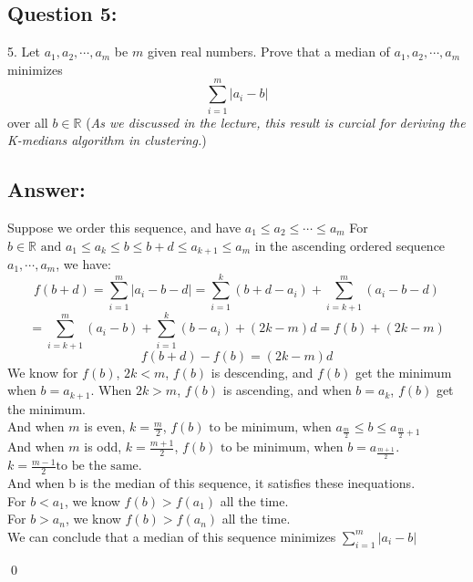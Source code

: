 \documentclass{article}
\newcommand{\R}{\mathbb{R}}
\renewenvironment{proof}{\begin{addmargin}[1em]{0em}\begin{newproof}}
{\end{newproof}\end{addmargin}\qed}
\begin{document}
\subsection*{Question 5:}
5. Let \(a_1, a_2, \cdots, a_m\) be \(m\) given real numbers. Prove that a median of \(a_1, a_2, \cdots, a_m\) minimizes
\[
    \sum_{i=1}^m|a_i - b|
\]
over all \(b \in \R\) (\textit{As we discussed in the lecture, this result is curcial for deriving the K-medians algorithm in clustering.})
\subsection*{Answer:}
\begin{proof}
Suppose we order this sequence, and have \(a_1 \leq a_2 \leq \cdots \leq a_m\) For \(b \in \R \text{ and } a_1 \leq a_k \leq b \leq b + d \leq a_{k+1}\leq a_m\) in the ascending ordered sequence \(a_1, \cdots, a_m\), we have:
\[
    f(b + d) = \sum_{i=1}^m|a_i - b - d| = \sum_{i=1}^{k}(b + d -a_i) + \sum_{i=k+1}^m(a_i - b - d)
\]
\[
    = \sum_{i=k+1}^m (a_i - b) + \sum_{i=1}^{k}(b - a_i) + (2k - m)d = f(b) + (2k-m)
\]
\[
    f(b + d) - f(b) = (2k - m)d
\]
We know for \(f(b)\), \(2k < m\), \(f(b)\) is descending, and \(f(b)\) get the minimum when \(b = a_{k+1}\). 
When \(2k > m\), \(f(b)\) is ascending, and when \(b = a_k\), \(f(b)\) get the minimum. \\

And when \(m\) is even, \(k = \frac m 2\), \(f(b)  \text{ to be minimum, when } a_{\frac m 2 } \leq b \leq a_{\frac m 2 + 1}\) \\
And when \(m\) is odd,  \(k = \frac {m + 1}2\), \(f(b) \text{ to be minimum, when } b = a_{\frac {m+1} 2 } \). \(k = \frac{m - 1}{2} \text{to be the same.}\) \\
And when b is the median of this sequence, it satisfies these inequations. \\

For \(b < a_1\), we know \(f(b) > f(a_1)\) all the time.\\
For \(b > a_n\), we know \(f(b) > f(a_n)\) all the time. \\
We can conclude that a median of this sequence minimizes \(\sum_{i=1}^m|a_i - b|\)

\end{proof}
\end{document}
